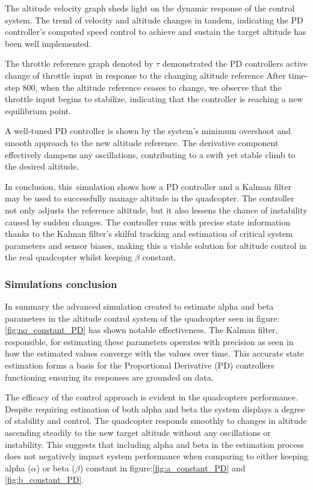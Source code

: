 \documentclass{article}
\begin{document}
The altitude velocity graph sheds light on the dynamic response of the control system. The trend of velocity and altitude changes in tandem, indicating the PD controller's computed speed control to achieve and sustain the target altitude has been well implemented.

The throttle reference graph denoted by \(\tau\) demonstrated the PD controllers active change of throttle input in response to the changing altitude reference After time-step 800, when the altitude reference ceases to change, we observe that the throttle input begins to stabilize, indicating that the controller is reaching a new equilibrium point.

A well-tuned PD controller is shown by the system's minimum overshoot and smooth approach to the new altitude reference. The derivative component effectively dampens any oscillations, contributing to a swift yet stable climb to the desired altitude.

In conclusion, this simulation shows how a PD controller and a Kalman filter may be used to successfully manage altitude in the quadcopter. The controller not only adjusts the reference altitude, but it also lessens the chance of instability caused by sudden changes. The controller runs with precise state information thanks to the Kalman 
filter's skilful tracking and estimation of critical system parameters and sensor biases, making this a viable solution for altitude control in the real quadcopter whilst keeping \(\beta\) constant. 

\subsubsection*{Simulations conclusion}
In summary the advanced simulation created to estimate alpha and beta parameters in the altitude control system of the quadcopter seen in figure:\ref{fig:no_constant_PD} has shown notable effectiveness. The Kalman filter, responsible, for estimating these parameters operates with precision as seen in how the estimated values converge with the values over time. 
This accurate state estimation forms a basis for the Proportional Derivative (PD) controllers functioning ensuring its responses are grounded on data.

The efficacy of the control approach is evident in the quadcopters performance. Despite requiring estimation of both alpha and beta the system displays a degree of stability and control. The quadcopter responds smoothly to changes in altitude ascending steadily to the new target altitude without any oscillations or instability. This suggests that including 
alpha and beta in the estimation process does not negatively impact system performance when comparing to either keeping alpha (\(\alpha\)) or beta (\(\beta\)) constant in figure:\ref{fig:a_constant_PD} and \ref{fig:b_constant_PD}. 
\end{document}
